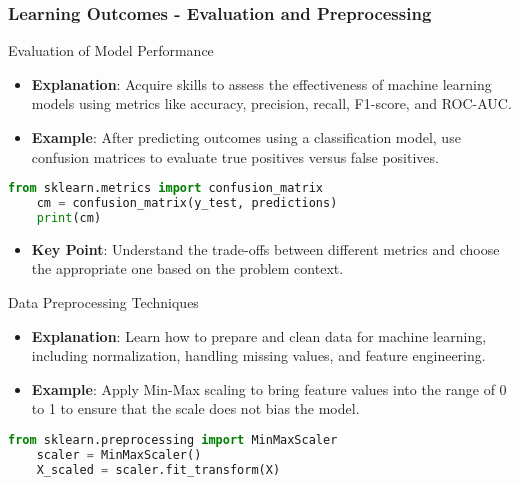 \documentclass[aspectratio=169]{beamer}
\begin{document}
\begin{frame}[fragile]
    \frametitle{Learning Outcomes - Evaluation and Preprocessing}
    \begin{block}{Evaluation of Model Performance}
        \begin{itemize}
            \item \textbf{Explanation}: Acquire skills to assess the effectiveness of machine learning models using metrics like accuracy, precision, recall, F1-score, and ROC-AUC.
            \item \textbf{Example}: After predicting outcomes using a classification model, use confusion matrices to evaluate true positives versus false positives.
        \end{itemize}
    \end{block}
    
    \begin{lstlisting}[language=Python]
    from sklearn.metrics import confusion_matrix
    cm = confusion_matrix(y_test, predictions)
    print(cm)
    \end{lstlisting}
    
    \begin{itemize}
        \item \textbf{Key Point}: Understand the trade-offs between different metrics and choose the appropriate one based on the problem context.
    \end{itemize}
    
    \begin{block}{Data Preprocessing Techniques}
        \begin{itemize}
            \item \textbf{Explanation}: Learn how to prepare and clean data for machine learning, including normalization, handling missing values, and feature engineering.
            \item \textbf{Example}: Apply Min-Max scaling to bring feature values into the range of 0 to 1 to ensure that the scale does not bias the model.
        \end{itemize}
    \end{block}
    
    \begin{lstlisting}[language=Python]
    from sklearn.preprocessing import MinMaxScaler
    scaler = MinMaxScaler()
    X_scaled = scaler.fit_transform(X)
    \end{lstlisting}
\end{frame}
\end{document}
